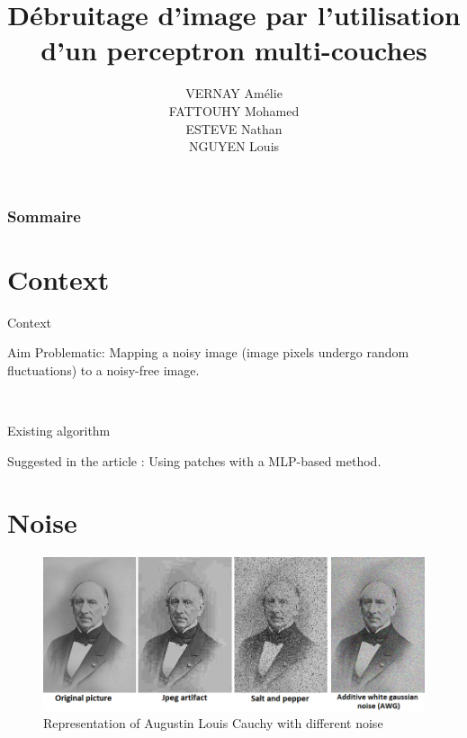 \documentclass[8pt]{beamer}
\title{Débruitage d'image par l'utilisation d'un perceptron multi-couches}
\author{VERNAY Amélie \\ FATTOUHY Mohamed \\ ESTEVE Nathan \\ NGUYEN Louis}
\begin{document}
\begin{frame}
\titlepage
\end{frame}


\begin{frame}
\frametitle{Sommaire}
\tableofcontents
\end{frame}


\section{Context}

\begin{frame}{Context}
\begin{block}{Aim}
Problematic: Mapping a noisy image (image pixels undergo random fluctuations) to a noisy-free image.
\end{block}\

\begin{block}{Existing algorithm}
\end{block}

\begin{block}{}
Suggested in the article : Using patches with a MLP-based method.
\end{block}


\end{frame}

\section{Noise}

\begin{frame}

\begin{figure}[H]
    \begin{center}
        \includegraphics[scale=0.45]{../datasets/images/Allnoise.png}
        \caption{Representation of Augustin Louis Cauchy with different noise}
    \end{center}
\end{figure}

\end{frame}
\end{document}
